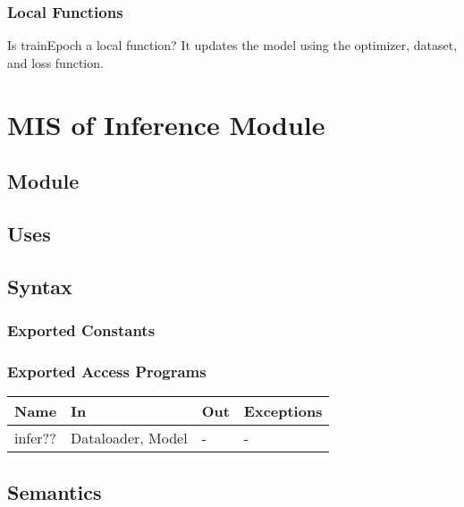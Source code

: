 \documentclass[12pt, titlepage]{article}
\begin{document}
\subsubsection{Local Functions}

Is trainEpoch a local function? It updates the model using the optimizer, dataset, and loss function.

\newpage

\section{MIS of Inference Module} \label{Module} 

\subsection{Module}



\subsection{Uses}


\subsection{Syntax}



\subsubsection{Exported Constants}



\subsubsection{Exported Access Programs}

\begin{center}
\begin{tabular}{p{2cm} p{4cm} p{4cm} p{2cm}}
\hline
\textbf{Name} & \textbf{In} & \textbf{Out} & \textbf{Exceptions} \\
\hline
infer?? & Dataloader, Model & - & - \\
\hline
\end{tabular}
\end{center}

\subsection{Semantics}
\end{document}
